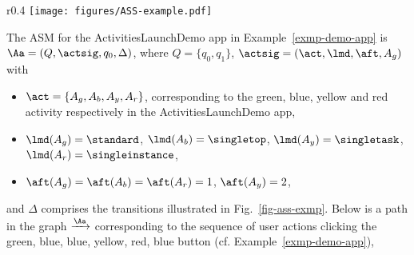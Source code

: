 {\begin{wrapfigure}{r}{0.4\textwidth}
	\vspace{-12mm}
\centering
		\texttt{[image: figures/ASS-example.pdf]}
		\caption{ASM corresponding to the ActivitiesLaunchDemo app}
		\label{fig-ass-exmp}
	\vspace{-12mm}
\end{wrapfigure}
\begin{example} \label{exmp-ass}
The ASM for the ActivitiesLaunchDemo app in Example~\ref{exmp-demo-app} is $\Aa = (Q, \actsig, q_0, \Delta)$,
%
 where  $Q = \{q_0, q_1\}$, $\actsig=(\act,\lmd, \aft, A_g)$ with
\begin{itemize}
\item $\act=\{A_g, A_b, A_y, A_r\}$, corresponding to the green, blue, yellow and red activity respectively in the ActivitiesLaunchDemo app,
\item $\lmd(A_g) = \standard$, $\lmd(A_b) = \singletop$, $\lmd(A_y) = \singletask$, $\lmd(A_r) = \singleinstance$,
\item $\aft(A_g) = \aft(A_b) = \aft(A_r) = 1$, $\aft(A_y) = 2$,
\end{itemize}
and $\Delta$ comprises the transitions illustrated in Fig.~\ref{fig-ass-exmp}.
%
%
%
%
Below is a path in the graph $\xrightarrow{\Aa}$ corresponding to the sequence of user actions clicking the green, blue, blue, yellow, red, blue button (cf. Example~\ref{exmp-demo-app}),
%

\end{example}}
